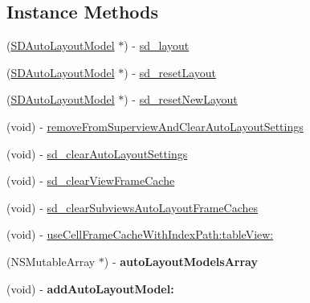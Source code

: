 \subsection*{Instance Methods}
\begin{DoxyCompactItemize}
\item 
(\mbox{\hyperlink{interface_s_d_auto_layout_model}{S\+D\+Auto\+Layout\+Model}} $\ast$) -\/ \mbox{\hyperlink{category_u_i_view_07_s_d_auto_layout_08_a0ecc61dfaf882906162e457bb2a5cfda}{sd\+\_\+layout}}
\item 
(\mbox{\hyperlink{interface_s_d_auto_layout_model}{S\+D\+Auto\+Layout\+Model}} $\ast$) -\/ \mbox{\hyperlink{category_u_i_view_07_s_d_auto_layout_08_a201cefc7d62e11f11f68ef12a2c499f6}{sd\+\_\+reset\+Layout}}
\item 
(\mbox{\hyperlink{interface_s_d_auto_layout_model}{S\+D\+Auto\+Layout\+Model}} $\ast$) -\/ \mbox{\hyperlink{category_u_i_view_07_s_d_auto_layout_08_a153c9536a475a6ea852e56f7bec9c4a9}{sd\+\_\+reset\+New\+Layout}}
\item 
(void) -\/ \mbox{\hyperlink{category_u_i_view_07_s_d_auto_layout_08_a0fb22a4dd54ef8a7be1a1e8e2f92787c}{remove\+From\+Superview\+And\+Clear\+Auto\+Layout\+Settings}}
\item 
(void) -\/ \mbox{\hyperlink{category_u_i_view_07_s_d_auto_layout_08_a0604c0bd6005c65aa163f700b8aec8d5}{sd\+\_\+clear\+Auto\+Layout\+Settings}}
\item 
(void) -\/ \mbox{\hyperlink{category_u_i_view_07_s_d_auto_layout_08_a52903f3c5267dfa7a517313f8ccf3ac4}{sd\+\_\+clear\+View\+Frame\+Cache}}
\item 
(void) -\/ \mbox{\hyperlink{category_u_i_view_07_s_d_auto_layout_08_afe494804af352201760acbd3226c6e54}{sd\+\_\+clear\+Subviews\+Auto\+Layout\+Frame\+Caches}}
\item 
(void) -\/ \mbox{\hyperlink{category_u_i_view_07_s_d_auto_layout_08_a50e23f4176d2c7be1acae226cdc58703}{use\+Cell\+Frame\+Cache\+With\+Index\+Path\+:table\+View\+:}}
\item 
\mbox{\label{category_u_i_view_07_s_d_auto_layout_08_a90d0de936dd3269d3fd3ed68051966ab}} 
(N\+S\+Mutable\+Array $\ast$) -\/ {\bfseries auto\+Layout\+Models\+Array}
\item 
\mbox{\label{category_u_i_view_07_s_d_auto_layout_08_aa41bfa2f4eef474014957d05c9b5b728}} 
(void) -\/ {\bfseries add\+Auto\+Layout\+Model\+:}
\item 

\end{DoxyCompactItemize}
